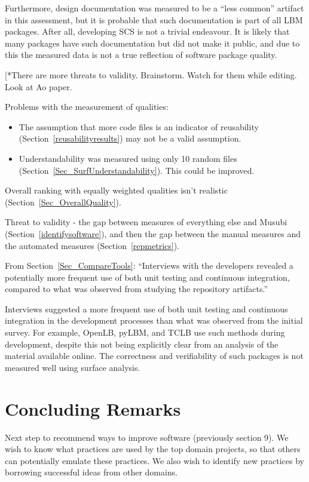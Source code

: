 \documentclass[runningheads]{llncs}
\begin{document}
Furthermore, design documentation was measured to be a ``less common'' artifact
in this assessment, but it is probable that such documentation is part of all
LBM packages. After all, developing SCS is not a trivial endeavour. It is likely
that many packages have such documentation but did not make it public, and due
to this the measured data is not a true reflection of software package quality.

[*{There are more threats to validity.  Brainstorm.  Watch for them while 
editing.  Look at Ao paper.}

Problems with the measurement of qualities:

\begin{itemize}
\item The assumption that more code files is an indicator of reusability
(Section~\ref{reusabilityresults}) may not be a valid assumption.
\item Understandability was measured using only 10 random files
(Section~\ref{Sec_SurfUnderstandability}).  This could be improved.
\end{itemize}

Overall ranking with equally weighted qualities isn't realistic
(Section~\ref{Sec_OverallQuality}).

Threat to validity - the gap between measures of everything else and Musubi
(Section~\ref{identifysoftware}), and then the gap between the manual measures
and the automated measures (Section~\ref{repmetrics}).

From Section~\ref{Sec_CompareTools}: ``Interviews with the developers revealed a
potentially more frequent use of both unit testing and continuous integration,
compared to what was observed from studying the repository artifacts.''

Interviews suggested a more frequent use of both unit testing and continuous
integration in the development processes than what was observed from the initial
survey. For example, OpenLB, pyLBM, and TCLB use such methods during
development, despite this not being explicitly clear from an analysis of the
material available online.  The correctness and verifiability of such packages
is not measured well using surface analysis.

\section{Concluding Remarks} \label{SecConcludingRemarks}

Next step to recommend ways to improve software (previously section 9).  We wish
to know what practices are used by the top domain projects, so that others can
potentially emulate these practices. We also wish to identify new practices by
borrowing successful ideas from other domains. 
\end{document}
